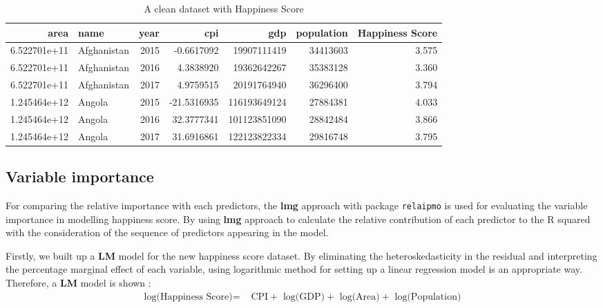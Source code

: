 \documentclass[11pt,a4paper,]{article}
\begin{document}
\begin{table}

\caption{\label{tab:tableHS}A clean dataset with Happiness Score}
\centering
\begin{tabular}[t]{r|l|r|r|r|r|r}
\hline
area & name & year & cpi & gdp & population & Happiness Score\\
\hline
6.522701e+11 & Afghanistan & 2015 & -0.6617092 & 19907111419 & 34413603 & 3.575\\
\hline
6.522701e+11 & Afghanistan & 2016 & 4.3838920 & 19362642267 & 35383128 & 3.360\\
\hline
6.522701e+11 & Afghanistan & 2017 & 4.9759515 & 20191764940 & 36296400 & 3.794\\
\hline
1.245464e+12 & Angola & 2015 & -21.5316935 & 116193649124 & 27884381 & 4.033\\
\hline
1.245464e+12 & Angola & 2016 & 32.3777341 & 101123851090 & 28842484 & 3.866\\
\hline
1.245464e+12 & Angola & 2017 & 31.6916861 & 122123822334 & 29816748 & 3.795\\
\hline
\end{tabular}
\end{table}

\clearpage

\hypertarget{variable-importance}{%
\subsection{Variable importance}\label{variable-importance}}

For comparing the relative importance with each predictors, the \textbf{lmg} approach with package \texttt{relaipmo} \autocite{relaimpo} is used for evaluating the variable importance in modelling happiness score. By using \textbf{lmg} approach to calculate the relative contribution of each predictor to the R squared with the consideration of the sequence of predictors appearing in the model.

Firstly, we built up a \textbf{LM} model for the new happiness score dataset. By eliminating the heteroskedasticity in the residual and interpreting the percentage marginal effect of each variable, using logarithmic method for setting up a linear regression model is an appropriate way. Therefore, a \textbf{LM} model is shown :
\begin{align*}
\text{log(Happiness Score)} = & \text{ CPI} +  \text{ log(GDP)}+\text{ log(Area)}+ \text{ log(Population)} 
\end{align*}
\end{document}

